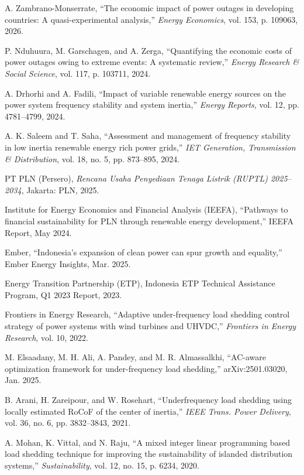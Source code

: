 
A. Zambrano-Monserrate, ``The economic impact of power outages in developing countries: A quasi-experimental analysis,'' \emph{Energy Economics}, vol. 153, p. 109063, 2026.

P. Nduhuura, M. Garschagen, and A. Zerga, ``Quantifying the economic costs of power outages owing to extreme events: A systematic review,'' \emph{Energy Research \& Social Science}, vol. 117, p. 103711, 2024.

A. Drhorhi and A. Fadili, ``Impact of variable renewable energy sources on the power system frequency stability and system inertia,'' \emph{Energy Reports}, vol. 12, pp. 4781--4799, 2024.

A. K. Saleem and T. Saha, ``Assessment and management of frequency stability in low inertia renewable energy rich power grids,'' \emph{IET Generation, Transmission \& Distribution}, vol. 18, no. 5, pp. 873--895, 2024.

PT PLN (Persero), \emph{Rencana Usaha Penyediaan Tenaga Listrik (RUPTL) 2025--2034}, Jakarta: PLN, 2025.

Institute for Energy Economics and Financial Analysis (IEEFA), ``Pathways to financial sustainability for PLN through renewable energy development,'' IEEFA Report, May 2024.

Ember, ``Indonesia's expansion of clean power can spur growth and equality,'' Ember Energy Insights, Mar. 2025.

Energy Transition Partnership (ETP), Indonesia ETP Technical Assistance Program, Q1 2023 Report, 2023.

Frontiers in Energy Research, ``Adaptive under-frequency load shedding control strategy of power systems with wind turbines and UHVDC,'' \emph{Frontiers in Energy Research}, vol. 10, 2022.

M. Elsaadany, M. H. Ali, A. Pandey, and M. R. Almassalkhi, ``AC-aware optimization framework for under-frequency load shedding,'' arXiv:2501.03020, Jan. 2025.

B. Arani, H. Zareipour, and W. Rosehart, ``Underfrequency load shedding using locally estimated RoCoF of the center of inertia,'' \emph{IEEE Trans. Power Delivery}, vol. 36, no. 6, pp. 3832--3843, 2021.

A. Mohan, K. Vittal, and N. Raju, ``A mixed integer linear programming based load shedding technique for improving the sustainability of islanded distribution systems,'' \emph{Sustainability}, vol. 12, no. 15, p. 6234, 2020.

